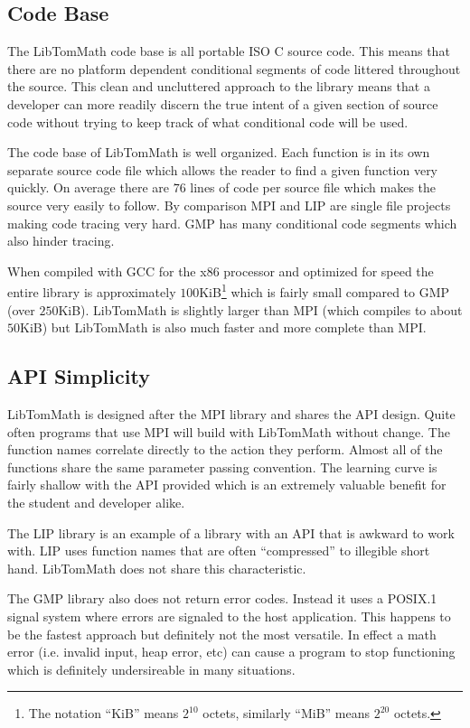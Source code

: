 \documentclass[b5paper]{book}
\begin{document}
\subsection{Code Base}
The LibTomMath code base is all portable ISO C source code.  This means that there are no platform dependent conditional
segments of code littered throughout the source.  This clean and uncluttered approach to the library means that a
developer can more readily discern the true intent of a given section of source code without trying to keep track of
what conditional code will be used.

The code base of LibTomMath is well organized.  Each function is in its own separate source code file 
which allows the reader to find a given function very quickly.  On average there are $76$ lines of code per source
file which makes the source very easily to follow.  By comparison MPI and LIP are single file projects making code tracing
very hard.  GMP has many conditional code segments which also hinder tracing.  

When compiled with GCC for the x86 processor and optimized for speed the entire library is approximately $100$KiB\footnote{The notation ``KiB'' means $2^{10}$ octets, similarly ``MiB'' means $2^{20}$ octets.}
 which is fairly small compared to GMP (over $250$KiB).  LibTomMath is slightly larger than MPI (which compiles to about 
$50$KiB) but LibTomMath is also much faster and more complete than MPI.

\subsection{API Simplicity}
LibTomMath is designed after the MPI library and shares the API design.  Quite often programs that use MPI will build 
with LibTomMath without change. The function names correlate directly to the action they perform.  Almost all of the 
functions share the same parameter passing convention.  The learning curve is fairly shallow with the API provided 
which is an extremely valuable benefit for the student and developer alike.  

The LIP library is an example of a library with an API that is awkward to work with.  LIP uses function names that are often ``compressed'' to 
illegible short hand.  LibTomMath does not share this characteristic.  

The GMP library also does not return error codes.  Instead it uses a POSIX.1 \cite{POSIX1} signal system where errors
are signaled to the host application.  This happens to be the fastest approach but definitely not the most versatile.  In
effect a math error (i.e. invalid input, heap error, etc) can cause a program to stop functioning which is definitely 
undersireable in many situations.
\end{document}
